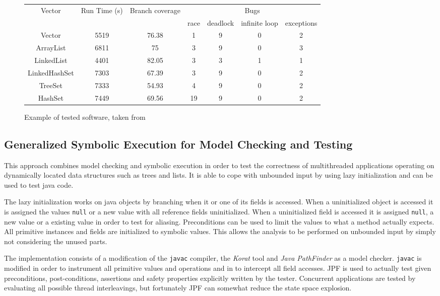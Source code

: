 \documentclass[10pt]{llncs}
\begin{document}
\begin{figure}
	\centering
	
	\begin{tabular}{c | c | c | c | c | c | c}
		Vector & Run Time (s) & Branch coverage & \multicolumn{4}{c}{Bugs} \\
		\cline{4-7}
		& & & race & deadlock & infinite loop & exceptions \\
		 
		\hline
		
		Vector & 5519 & 76.38 & 1&9&0&2 \\
		ArrayList & 6811 & 75 & 3&9&0&3 \\
		LinkedList & 4401 & 82.05 & 3&3&1&1 \\
		LinkedHashSet & 7303 & 67.39 & 3&9&0&2 \\
		TreeSet & 7333 & 54.93 & 4&9&0&2 \\
		HashSet & 7449 & 69.56 & 19&9&0&2 \\
	\end{tabular}
	
	\caption{Example of tested software, taken from \cite{base4}}
	\label{example:4}
\end{figure}

\subsection{Generalized Symbolic Execution for Model Checking and Testing \cite{base5}}

This approach combines model checking and symbolic execution in order to test the correctness of multithreaded applications operating on dynamically located data structures such as trees and lists. It is able to cope with unbounded input by using lazy initialization and can be used to test java code.

The lazy initialization works on java objects by branching when it or one of its fields is accessed. When a uninitialized object is accessed it is assigned the values \texttt{null} or a new value with all reference fields uninitialized. When a uninitialized field is accessed it is assigned \texttt{null}, a new value or a existing value in order to test for aliasing. Preconditions can be used to limit the values to what a method actually expects. All primitive instances and fields are initialized to symbolic values. This allows the analysis to be performed on unbounded input by simply not considering the unused parts.

The implementation consists of a modification of the \texttt{javac} compiler, the \emph{Korat} tool \cite{korat} and \emph{Java PathFinder} \cite{pathfinder} as a model checker. \texttt{javac} is modified in order to instrument all primitive values and operations and in to intercept all field accesses. JPF is used to actually test given preconditions, post-conditions, assertions and safety properties explicitly written by the tester. Concurrent applications are tested by evaluating all possible thread interleavings, but fortunately JPF can somewhat reduce the state space explosion.
\end{document}
